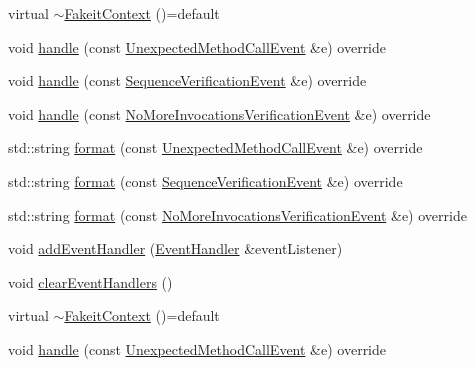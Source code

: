 \begin{DoxyCompactItemize}
virtual \mbox{\hyperlink{structfakeit_1_1FakeitContext_adfad726870dfba97246a9ddfddd3a3d5}{$\sim$\+Fakeit\+Context}} ()=default
\item 
void \mbox{\hyperlink{structfakeit_1_1FakeitContext_ac39067234f37a88f6c19440df0bc1b32}{handle}} (const \mbox{\hyperlink{structfakeit_1_1UnexpectedMethodCallEvent}{Unexpected\+Method\+Call\+Event}} \&e) override
\item 
void \mbox{\hyperlink{structfakeit_1_1FakeitContext_a6b77f1360c9f8f4165e1152173789d6e}{handle}} (const \mbox{\hyperlink{structfakeit_1_1SequenceVerificationEvent}{Sequence\+Verification\+Event}} \&e) override
\item 
void \mbox{\hyperlink{structfakeit_1_1FakeitContext_a09e2d757900d3c49a1b17694fa0395f1}{handle}} (const \mbox{\hyperlink{structfakeit_1_1NoMoreInvocationsVerificationEvent}{No\+More\+Invocations\+Verification\+Event}} \&e) override
\item 
std\+::string \mbox{\hyperlink{structfakeit_1_1FakeitContext_a4da398d63e45c922606bbd5aaff30f6e}{format}} (const \mbox{\hyperlink{structfakeit_1_1UnexpectedMethodCallEvent}{Unexpected\+Method\+Call\+Event}} \&e) override
\item 
std\+::string \mbox{\hyperlink{structfakeit_1_1FakeitContext_af163c4c51929ef14c1c5529f2f42c40b}{format}} (const \mbox{\hyperlink{structfakeit_1_1SequenceVerificationEvent}{Sequence\+Verification\+Event}} \&e) override
\item 
std\+::string \mbox{\hyperlink{structfakeit_1_1FakeitContext_a49fae6e849a57fff6906a1a313fb4267}{format}} (const \mbox{\hyperlink{structfakeit_1_1NoMoreInvocationsVerificationEvent}{No\+More\+Invocations\+Verification\+Event}} \&e) override
\item 
void \mbox{\hyperlink{structfakeit_1_1FakeitContext_a176ad0df1fcb2758648f2c9b6c8fdd0d}{add\+Event\+Handler}} (\mbox{\hyperlink{structfakeit_1_1EventHandler}{Event\+Handler}} \&event\+Listener)
\item 
void \mbox{\hyperlink{structfakeit_1_1FakeitContext_a65960b8d910f35fa5c3f596f693e5c17}{clear\+Event\+Handlers}} ()
\item 
virtual \mbox{\hyperlink{structfakeit_1_1FakeitContext_adfad726870dfba97246a9ddfddd3a3d5}{$\sim$\+Fakeit\+Context}} ()=default
\item 
void \mbox{\hyperlink{structfakeit_1_1FakeitContext_ac39067234f37a88f6c19440df0bc1b32}{handle}} (const \mbox{\hyperlink{structfakeit_1_1UnexpectedMethodCallEvent}{Unexpected\+Method\+Call\+Event}} \&e) override
\item 

\end{DoxyCompactItemize}

